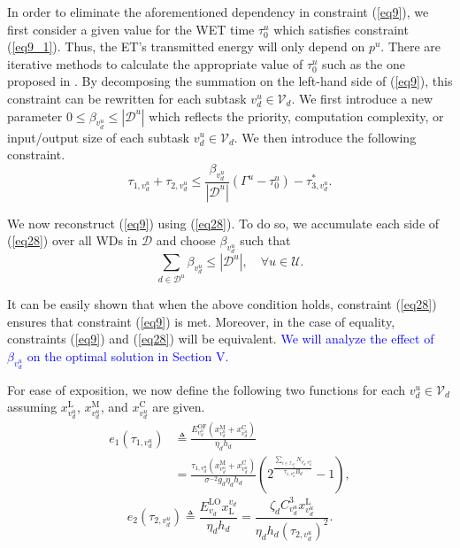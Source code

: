 \documentclass[12pt,draftclsnofoot,onecolumn]{IEEEtran}
\begin{document}
In order to eliminate the aforementioned dependency in constraint (\ref{eq9}), we first consider a given value for the WET time $\tau_0^u$ which satisfies constraint (\ref{eq9_1}). Thus, the ET's transmitted energy will only depend on $p^u$. There are iterative methods to calculate the appropriate value of $\tau_0^u$ such as the one proposed in \cite{b2}. By decomposing the summation on the left-hand side of (\ref{eq9}), this constraint can be rewritten for each subtask $v_d^u\in\mathcal{V}_d$. We first introduce a new parameter $0\leq\beta_{v_d^u}\leq|\mathcal{D}^u|$ which reflects the priority, computation complexity, or input/output size of each subtask $v_d^u\in\mathcal{V}_d$. We then introduce the following constraint.
\begin{equation}\label{eq28}
	\tau_{1,v_d^u} + \tau_{2,v_d^u} \leq \frac{\beta_{v_d^u}}{|\mathcal{D}^u|}\left(\Gamma^u-\tau_0^u\right) - \tau_{3,v_d^u}^{\ast}.
\end{equation}

We now reconstruct (\ref{eq9}) using (\ref{eq28}). To do so, we accumulate each side of (\ref{eq28}) over all WDs in $\mathcal{D}$ and choose $\beta_{v_d^u}$ such that
\begin{equation}\label{eq27}
	\sum_{d\in\mathcal{D}^u}\beta_{v_d^u} \leq 	|\mathcal{D}^u|,\quad\forall u\in\mathcal{U}.
\end{equation}

It can be easily shown that when the above condition holds, constraint (\ref{eq28}) ensures that constraint (\ref{eq9}) is met. Moreover, in the case of equality, constraints (\ref{eq9}) and (\ref{eq28}) will be equivalent. \textcolor{blue}{We will analyze the effect of $\beta_{v_d^u}$ on the optimal solution in Section V.}

For ease of exposition, we now define the following two functions for each $v_d^u\in\mathcal{V}_d$ assuming $x^{\text{L}}_{v_d^u}$, $x^{\text{M}}_{v_d^u}$, and $x^{\text{C}}_{v_d^u}$ are given.
\begin{equation}\label{eq20}
	\begin{aligned}
		e_1(\tau_{1,v_d^u}) &\triangleq \frac{E^{\text{OF}}_{v_d^u}\left(x^{\text{M}}_{v_d^u}+x^{\text{C}}_{v_d^u}\right)}{\eta_d h_d}\\
		&= \frac{\tau_{1,v_d^u}\left(x^{\text{M}}_{v_d^u}+x^{\text{C}}_{v_d^u}\right)}{\sigma^{-2}g_d\eta_d h_d}\left(2^{\frac{\sum_{i\in\mathcal{I}_{v_d^u}}{N_{v_d^i,v_d^u}}}{\tau_{1,v_d^u}B_d}}-1\right),
	\end{aligned}
\end{equation}
\begin{equation}\label{eq21}
	e_2(\tau_{2,v_d^u}) \triangleq \frac{E^{\text{LO}}_{v_d}x_{\text{L}}^{v_d}}{\eta_d h_d} = \frac{\zeta_d C_{v_d^u}^3x^{\text{L}}_{v_d^u}}{\eta_d h_d\left(\tau_{2,v_d^u}\right)^2}.
\end{equation}
\end{document}
